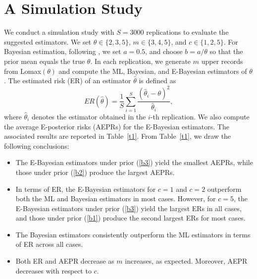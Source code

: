 \documentclass[twoside]{article}
\begin{document}
\section{A Simulation Study}	
We conduct a simulation study with $S=3000$ replications to evaluate the suggested estimators. We set $\theta \in \{2,3,5\}$, $m \in \{3,4,5\}$, and $c \in \{1,2,5\}$. For Bayesian estimation, following \cite{Ghasabani:et:al:2026}, we  set $a=0.5$, and   choose $b=a/\theta$ so that the prior mean equals the true $\theta$.
In each replication, we generate $m$ upper records from Lomax$(\theta)$ and compute the ML, Bayesian, and E-Bayesian estimators of $\theta$.  The estimated risk (ER) of an estimator $\hat{\theta}$ is defined as
\[
ER(\hat{\theta}) = \frac{1}{S} \sum_{i=1}^{S} \frac{(\hat{\theta}_i - \theta)^2}{\hat{\theta}_i},
\]
where $\hat{\theta}_i$ denotes the estimator obtained in the $i$-th replication. We also compute the average E-posterior risks (AEPRs) for the E-Bayesian estimators. The associated results are reported in Table~\ref{t1}. From Table~\ref{t1}, we draw the following conclusions:
\begin{itemize}
\item The E-Bayesian estimators under prior (\ref{b3}) yield the smallest AEPRs, while those under prior (\ref{b2}) produce the largest AEPRs.
\item In terms of ER, the E-Bayesian estimators  for $c=1$ and $c=2$ outperform both the ML and Bayesian estimators in most cases. However, for $c=5$, the E-Bayesian estimators under prior (\ref{b3}) yield the largest ERs in all cases,  and those under prior (\ref{b1}) produce the second largest ERs for most cases.
\item The Bayesian estimators consistently outperform the ML estimators in terms of ER across all cases.
\item Both ER and AEPR decrease as $m$ increases, as expected. Moreover, AEPR decreases with respect to $c$.
\end{itemize}
\end{document}
